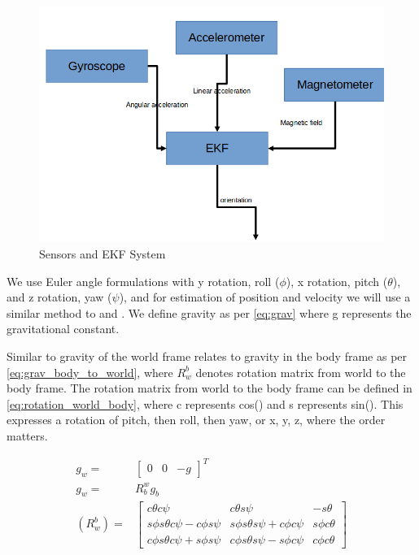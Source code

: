 \documentclass[conference]{IEEEtran}
\begin{document}
\begin{figure}[h!]
  \includegraphics[width=\columnwidth]{fig_2_ekf.png}
  \caption{Sensors and EKF System}
  \label{fig:ekf}
\end{figure}


We use Euler angle formulations with y rotation, roll ($\phi$), x rotation, pitch ($\theta$), and z rotation, yaw ($\psi$), and for estimation of position and velocity we will use a similar method to \cite{b18} and \cite{b21}. We define gravity as per \eqref{eq:grav} where g represents the gravitational constant.


Similar to \cite{b19} gravity of the world frame relates to gravity in the body frame as per \eqref{eq:grav_body_to_world}, where $R_{w}^b$ denotes rotation matrix from world to the body frame. The rotation matrix from world to the body frame can be defined in \eqref{eq:rotation_world_body}, where c represents cos() and s represents sin(). This expresses a rotation of pitch, then roll, then yaw, or x, y, z, where the order matters.

\begin{align}
g_w =& \begin{bmatrix}0& 0& -g\end{bmatrix}^T \label{eq:grav}\\
g_w =& R_{b}^w g_b \label{eq:grav_body_to_world} \\
(R_{w}^b) =& \begin{bmatrix} c\theta c\psi& c\theta s\psi& -s\theta\\
					  s \phi s\theta c\psi - c \phi s\psi& s\phi s\theta s\psi + c\phi c\psi& s \phi c \theta\\
					 c \phi s \theta c \psi + s \phi s \psi& c \phi s \theta s\psi - s \phi c\psi& c \phi c \theta	\end{bmatrix}\label{eq:rotation_world_body}
\end{align} 
\end{document}
